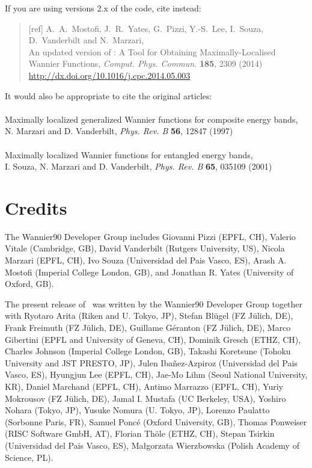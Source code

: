 If you are using versions 2.x of the code, cite instead:
\begin{quote}
[ref] A.~A.~Mostofi, J.~R.~Yates, G.~Pizzi, Y.-S.~Lee, I.~Souza, D.~Vanderbilt
and N.~Marzari,\\
An updated version of \wannier:
A Tool for Obtaining Maximally-Localised Wannier
  Functions, {\it Comput. Phys. Commun.} {\bf 185}, 2309 (2014)\\
\url{http://dx.doi.org/10.1016/j.cpc.2014.05.003}

\end{quote}

It would also be appropriate to cite the original articles:\\\\
Maximally localized generalized Wannier functions for composite
  energy bands,\\
N. Marzari and D. Vanderbilt, {\it Phys. Rev. B} {\bf 56}, 12847 (1997)\\\\
Maximally localized Wannier functions for entangled energy bands,\\
I. Souza, N. Marzari and D. Vanderbilt, {\it Phys. Rev. B} {\bf 65}, 035109 (2001)


\section*{Credits}
The Wannier90 Developer Group includes Giovanni Pizzi (EPFL, CH),
Valerio Vitale (Cambridge, GB),
David Vanderbilt  (Rutgers University, US),
Nicola Marzari    (EPFL, CH),
Ivo Souza         (Universidad del Pais Vasco, ES),
Arash A. Mostofi  (Imperial College London, GB), and
Jonathan R. Yates (University of Oxford, GB).

The present release of \wannier\ was written by the Wannier90 Developer Group together
with Ryotaro Arita (Riken and U. Tokyo, JP),
Stefan Bl\"ugel (FZ  J\"ulich, DE),
Frank Freimuth (FZ  J\"ulich, DE),
Guillame G\'eranton (FZ  J\"ulich, DE),
Marco Gibertini (EPFL and University of Geneva, CH),
Dominik Gresch (ETHZ, CH),
Charles Johnson (Imperial College London, GB),
Takashi Koretsune (Tohoku University and JST PRESTO, JP),
Julen Iba\~nez-Azpiroz (Universidad del Pais Vasco, ES),
Hyungjun Lee (EPFL, CH),
Jae-Mo Lihm (Seoul National University, KR),
Daniel Marchand (EPFL, CH),
Antimo Marrazzo (EPFL, CH),
Yuriy Mokrousov (FZ  J\"ulich, DE),
Jamal I. Mustafa (UC Berkeley, USA),
Yoshiro Nohara (Tokyo, JP),
Yusuke Nomura (U. Tokyo, JP),
Lorenzo Paulatto (Sorbonne Paris, FR),
Samuel Ponc\'e (Oxford University, GB),
Thomas Ponweiser (RISC Software GmbH, AT),
Florian Th\"ole (ETHZ, CH),
Stepan Tsirkin (Universidad del Pais Vasco, ES),
Ma\l{}gorzata Wierzbowska (Polish Academy of Science, PL).

